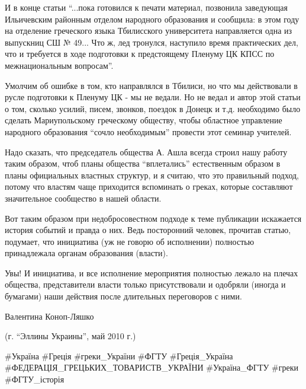 И в конце статьи \enquote{...пока готовился к печати материал, позвонила заведующая
Ильичевским районным отделом народного образования и сообщила: в этом году на
отделение греческого языка Тбилисского университета направляется одна из
выпускниц СШ № 49... Что ж, лед тронулся, наступило время практических дел, что и
требуется в ходе подготовки к предстоящему Пленуму ЦК КПСС по межнациональным
вопросам}. 

Умолчим об ошибке в том, кто направлялся в Тбилиси, но что мы действовали в
русле подготовки к Пленуму ЦК - мы не ведали. Но не ведал и автор этой статьи о
том, сколько усилий, писем, звонков, поездок в Донецк и т.д. необходимо было
сделать Мариупольскому греческому обществу, чтобы областное управление
народного образования \enquote{сочло необходимым} провести этот семинар учителей. 

Надо сказать, что председатель общества А. Ашла всегда строил нашу работу таким
образом, чтоб планы общества \enquote{вплетались} естественным образом в планы
официальных властных структур, и я считаю, что это правильный подход, потому
что властям чаще приходится вспоминать о греках, которые составляют
значительное сообщество в нашей области. 

Вот таким образом при недобросовестном подходе к теме публикации искажается
история событий и правда о них. Ведь посторонний человек, прочитав статью,
подумает, что инициатива (уж не говорю об исполнении) полностью принадлежала
органам образования (власти). 

Увы! И инициатива, и все исполнение мероприятия полностью лежало на плечах
общества, представители власти только присутствовали и одобряли (иногда и
бумагами) наши действия после длительных переговоров с ними.  

Валентина Коноп-Ляшко

(г. \enquote{Эллины Украины}, май 2010 г.)

\#Україна \#Греція \#греки\_України \#ФГТУ \#Греція\_Україна
\#ФЕДЕРАЦІЯ\_ГРЕЦЬКИХ\_ТОВАРИСТВ\_УКРАЇНИ  \#Україна\_ФГТУ \#греки
\#ФГТУ\_історія
